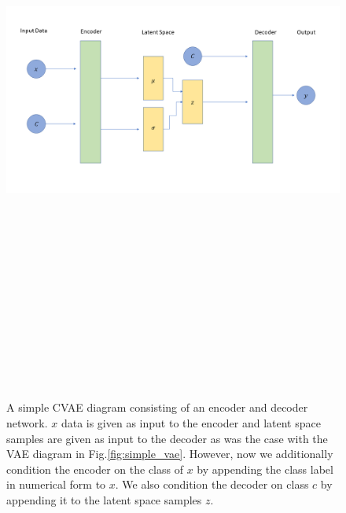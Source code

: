 \begin{figure}
    \centering
    \includegraphics[width=16cm,height=20cm,keepaspectratio]{figures/simple_cvae_diagram.png}
    \caption{A simple \ac{CVAE} diagram consisting of an encoder and decoder network. $x$ data is given as input to the encoder and latent space samples are given as input to the decoder as was the case with the \ac{VAE} diagram in Fig.\ref{fig:simple_vae}. However, now we additionally condition the encoder on the class of $x$ by appending the class label in numerical form to $x$. We also condition the decoder on class $c$ by appending it to the latent space samples $z$.}
    \label{fig:simple_cvae}
\end{figure}